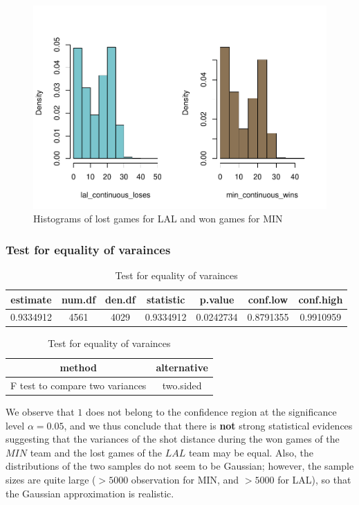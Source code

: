 \documentclass[
  11pt,
]{article}
\begin{document}
\begin{figure}

{\centering \includegraphics{index_files/figure-latex/histo-first-test-1} 

}

\caption{Histograms of lost games for LAL and won games for MIN}\label{fig:histo-first-test}
\end{figure}

\hypertarget{test-for-equality-of-varainces}{%
\subsubsection{Test for equality of varainces}\label{test-for-equality-of-varainces}}

\begin{table}[H]
\caption{\label{tab:first-var-test1}Test for equality of varainces}

\centering
\begin{tabular}[t]{ccccccc}
\toprule
estimate & num.df & den.df & statistic & p.value & conf.low & conf.high\\
\midrule
0.9334912 & 4561 & 4029 & 0.9334912 & 0.0242734 & 0.8791355 & 0.9910959\\
\bottomrule
\end{tabular}
\centering
\begin{tabular}[t]{cc}
\toprule
method & alternative\\
\midrule
F test to compare two variances & two.sided\\
\bottomrule
\end{tabular}
\end{table}

We observe that \(1\) does not belong to the confidence region at the significance level \(\alpha=0.05\), and we thus conclude that there is \textbf{not} strong statistical evidences suggesting that the variances of the shot distance during the won games of the \(MIN\) team and the lost games of the \(LAL\) team may be equal. Also, the distributions of the two samples do not seem to be Gaussian; however, the sample sizes are quite large (\(>5000\) observation for MIN, and \(>5000\) for LAL), so that the Gaussian approximation is realistic.
\end{document}
